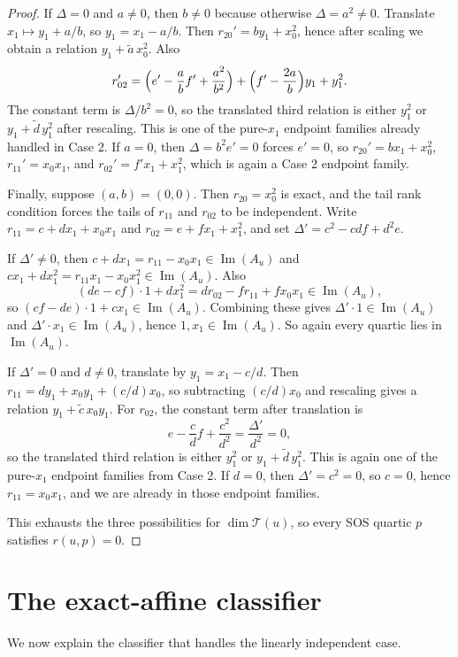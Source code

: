 \documentclass[10pt]{article}
\theoremstyle{definition}
\DeclareMathOperator{\imag}{Im}
\newcommand{\im}{\imag}
\newcommand{\Tail}{\mathcal{T}}
\begin{document}
\begin{proof}
If \(\Delta=0\) and \(a\neq 0\), then \(b\neq 0\) because otherwise
\(\Delta=a^2\neq 0\). Translate \(x_1\mapsto y_1+a/b\), so \(y_1=x_1-a/b\).
Then \(r_{20}'=b y_1+x_0^2\), hence after scaling we obtain a relation
\(y_1+\widetilde a\,x_0^2\). Also
\[
  r_{02}'=
  \Bigl(e'-\frac{a}{b}f'+\frac{a^2}{b^2}\Bigr)
  +\Bigl(f'-\frac{2a}{b}\Bigr)y_1+y_1^2.
\]
The constant term is \(\Delta/b^2=0\), so the translated third relation is
either \(y_1^2\) or \(y_1+\widetilde d\,y_1^2\) after rescaling. This is one of
the pure-\(x_1\) endpoint families already handled in Case 2. If \(a=0\), then
\(\Delta=b^2 e'=0\) forces \(e'=0\), so
\(r_{20}'=b x_1+x_0^2\), \(r_{11}'=x_0x_1\), and
\(r_{02}'=f' x_1+x_1^2\), which is again a Case 2 endpoint family.

Finally, suppose \((a,b)=(0,0)\). Then \(r_{20}=x_0^2\) is exact, and the tail
rank condition forces the tails of \(r_{11}\) and \(r_{02}\) to be
independent. Write \(r_{11}=c+d x_1+x_0x_1\) and
\(r_{02}=e+f x_1+x_1^2\), and set \(\Delta'=c^2-c d f+d^2 e\).

If \(\Delta'\neq 0\), then \(c+d x_1=r_{11}-x_0x_1\in \im(A_u)\) and
\(c x_1+d x_1^2=r_{11}x_1-x_0x_1^2\in \im(A_u)\). Also
\[
  (d e-c f)\cdot 1+d x_1^2=d r_{02}-f r_{11}+f x_0x_1\in \im(A_u),
\]
so \((c f-d e)\cdot 1+c x_1\in \im(A_u)\). Combining these gives
\(\Delta'\cdot 1\in \im(A_u)\) and \(\Delta'\cdot x_1\in \im(A_u)\), hence
\(1,x_1\in \im(A_u)\). So again every quartic lies in \(\im(A_u)\).

If \(\Delta'=0\) and \(d\neq 0\), translate by \(y_1=x_1-c/d\). Then
\(r_{11}=d y_1+x_0y_1+(c/d)x_0\), so subtracting \((c/d)x_0\) and rescaling
gives a relation \(y_1+\widetilde c\,x_0y_1\). For \(r_{02}\), the constant
term after translation is
\[
  e-\frac{c}{d}f+\frac{c^2}{d^2}=\frac{\Delta'}{d^2}=0,
\]
so the translated third relation is either \(y_1^2\) or
\(y_1+\widetilde d\,y_1^2\). This is again one of the pure-\(x_1\) endpoint
families from Case 2. If \(d=0\), then \(\Delta'=c^2=0\), so \(c=0\), hence
\(r_{11}=x_0x_1\), and we are already in those endpoint families.

This exhausts the three possibilities for \(\dim \Tail(u)\), so every SOS
quartic \(p\) satisfies \(r(u,p)=0\).
\end{proof}

\section{The exact-affine classifier}\label{sec:classifier}
We now explain the classifier that handles the linearly independent case.
\end{document}

